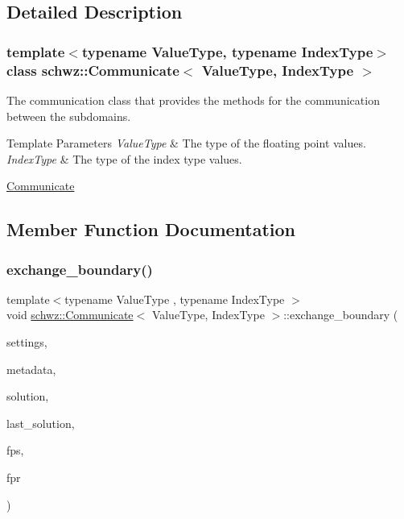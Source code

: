 \subsection{Detailed Description}
\subsubsection*{template$<$typename Value\+Type, typename Index\+Type$>$\newline
class schwz\+::\+Communicate$<$ Value\+Type, Index\+Type $>$}

The communication class that provides the methods for the communication between the subdomains. 


\begin{DoxyTemplParams}{Template Parameters}
{\em Value\+Type} & The type of the floating point values. \\
\hline
{\em Index\+Type} & The type of the index type values.\\
\hline
\end{DoxyTemplParams}
\hyperlink{group__comm}{Communicate} 

\subsection{Member Function Documentation}
\mbox{\label{classschwz_1_1Communicate_a40f61bcdae9d4d6a12091929944635a4}} 
\subsubsection{\texorpdfstring{exchange\+\_\+boundary()}{exchange\_boundary()}}
{\footnotesize\ttfamily template$<$typename Value\+Type , typename Index\+Type $>$ \\
void \hyperlink{classschwz_1_1Communicate}{schwz\+::\+Communicate}$<$ Value\+Type, Index\+Type $>$\+::exchange\+\_\+boundary (\begin{DoxyParamCaption}\item[{const \hyperlink{structschwz_1_1Settings}{Settings} \&}]{settings,  }\item[{const \hyperlink{structschwz_1_1Metadata}{Metadata}$<$ Value\+Type, Index\+Type $>$ \&}]{metadata,  }\item[{std\+::shared\+\_\+ptr$<$ gko\+::matrix\+::\+Dense$<$ Value\+Type $>$$>$ \&}]{solution,  }\item[{std\+::shared\+\_\+ptr$<$ gko\+::matrix\+::\+Dense$<$ Value\+Type $>$$>$ \&}]{last\+\_\+solution,  }\item[{std\+::ofstream \&}]{fps,  }\item[{std\+::ofstream \&}]{fpr }\end{DoxyParamCaption})\hspace{0.3cm}{\ttfamily [pure virtual]}}



